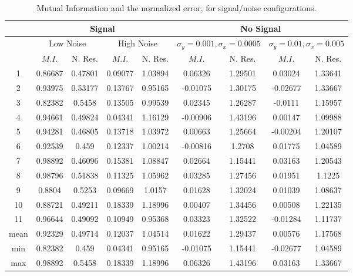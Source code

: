 \begin{table}[t]
\centering
\begin{tabular}{|c | c | c | c | c | c | c | c | c |}
\hline
& \multicolumn{4}{|c|}{Signal} & \multicolumn{4}{|c|}{No Signal}\\
\hline
& \multicolumn{2}{|c|}{Low Noise} & \multicolumn{2}{|c|}{High Noise}
& \multicolumn{2}{|c|}{$\sigma_y = 0.001, \sigma_x = 0.0005$}
& \multicolumn{2}{|c|}{$\sigma_y = 0.01, \sigma_x = 0.005$}\\
\hline
& $M.I.$ & N. Res. &
  $M.I.$ & N. Res. &
  $M.I.$ & N. Res. &
  $M.I.$ & N. Res. \\
\hline
\hline
1 &   0.86687  &0.47801 &  0.09077  &1.03894 &  0.06326  &  1.29501 & 0.03024  &1.33641 \\
2 &   0.93975  &0.53177 &  0.13767  &0.95165 &  -0.01075  & 1.30175 & -0.02677 &1.33667 \\
3 &   0.82382  &0.5458  &  0.13505  &0.99539 &  0.02345  &  1.26287 & -0.0111  &1.15957 \\
4 &   0.94661  &0.49824 &  0.04341  &1.16129 &  -0.00906  & 1.43196 & 0.00147  &1.09988 \\
5 &   0.94281  &0.46805 &  0.13718  &1.03972 &  0.00663  &  1.25664 & -0.00204 &1.20107 \\
6 &   0.92539  &0.459   &  0.12337  &1.00214 &  -0.00816  & 1.2708 &  0.01775  &1.04589 \\
7 &   0.98892  &0.46096 &  0.15381  &1.08847 &  0.02664  &  1.15441 & 0.03163  &1.20543 \\
8 &   0.98796  &0.51838 &  0.11325  &1.05962 &  0.03285  &  1.27456 & 0.01951  &1.1225 \\
9 &   0.8804   &0.5253  &  0.09669  &1.0157  &  0.01628  &  1.32024 & 0.01039  &1.08637 \\
10 &  0.88721   &0.49211 & 0.18339  &1.18996 &  0.00407  &  1.34456 & 0.00508  &1.22135 \\
11 &  0.96644   &0.49092 & 0.10949  &0.95368 &  0.03323  &  1.32522 & -0.01284 &1.11737 \\
\hline
mean &0.92329  &0.49714 & 0.12037   &1.04514 &  0.01622  &  1.29437 & 0.00576  &1.17568 \\
\hline
min &  0.82382  &0.459   &  0.04341  &0.95165 & -0.01075  & 1.15441 & -0.02677 &1.04589 \\
\hline
max &  0.98892  &0.5458  & 0.18339   &1.18996 & 0.06326  &  1.43196 & 0.03163  &1.33667 \\
\hline
\end{tabular}
\caption{Mutual Information and the normalized error,
    for signal/noise configurations.}
\label{tab:SingleVoxelActivationComparison}
\end{table}


